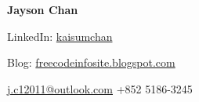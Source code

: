 
\begin{minipage}[b][][c]{15em}
    \Huge\bfseries\color{color-title}
    Jayson Chan %
\end{minipage}%
\hfill
\begin{minipage}[b][][b]{10em}
    \raggedleft
    \small
    LinkedIn: \href{https://www.linkedin.com/in/kaisumchan/}{kaisumchan}


    Blog: \href{https://freecodeinfosite.blogspot.com/}{freecodeinfosite.blogspot.com}

\end{minipage}%
\hspace{1em}
\begin{minipage}[b][][b]{6.5em}
    \raggedleft
    \small
    \href{mailto:j.c12011@outlook.com}{j.c12011@outlook.com} %
    +852 5186-3245 %
\end{minipage}
